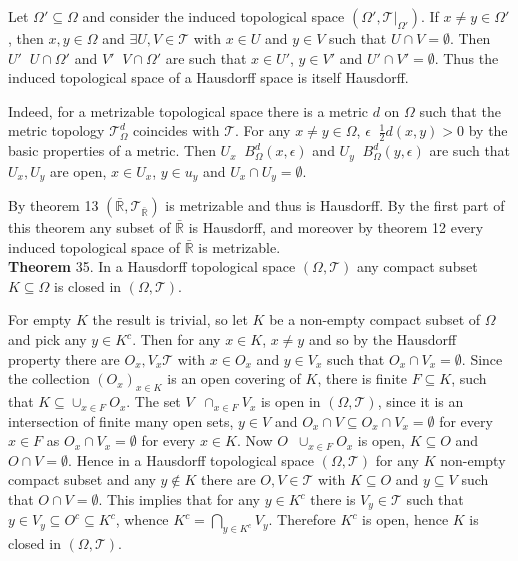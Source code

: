 \documentclass[a4paper]{article}
\newcommand{\brac}[1]{\left ( #1 \right )}
\newcommand{\induc}[1]{\left . #1 \right \vert}
\newcommand{\Rbar}{{\bar{\mathbb{R}}}}
\newcommand{\Tcal}{\mathcal{T}}
\newcommand{\defn}{\mathop{\overset{\Delta}{=}}\nolimits}
\begin{document}
Let $\Omega'\subseteq \Omega$ and consider the induced topological space $\brac{\Omega', \induc{\Tcal}_{\Omega'}}$. If $x\neq y\in \Omega'$, then $x, y\in\Omega$ and $\exists U, V\in \Tcal$ with $x\in U$ and $y\in V$ such that $U\cap V = \emptyset$. Then $U'\defn U\cap \Omega'$ and $V'\defn V\cap \Omega'$ are such that $x\in U'$, $y\in V'$ and $U'\cap V' = \emptyset$. Thus the induced topological space of a Hausdorff space is itself Hausdorff.

Indeed, for a metrizable topological space there is a metric $d$ on $\Omega$ such that the metric topology $\Tcal_\Omega^d$ coincides with $\Tcal$. For any $x\neq y\in \Omega$, $\epsilon\defn \frac{1}{2} d\brac{x,y} > 0$ by the basic properties of a metric. Then $U_x\defn B_\Omega^d\brac{x, \epsilon}$ and $U_y\defn B_\Omega^d\brac{y, \epsilon}$ are such that $U_x, U_y$ are open, $x\in U_x$, $y\in u_y$ and $U_x\cap U_y = \emptyset$.

By theorem 13 $\brac{\Rbar, \Tcal_\Rbar}$ is metrizable and thus is Hausdorff. By the first part of this theorem any subset of $\Rbar$ is Hausdorff, and moreover by theorem 12 every induced topological space of $\Rbar$ is metrizable.\\

\label{thm:hausdorf_compact_closed} \noindent \textbf{Theorem} 35.
In a Hausdorff topological space $\brac{\Omega, \Tcal}$ any compact subset $K\subseteq \Omega$ is closed in $\brac{\Omega, \Tcal}$.

For empty $K$ the result is trivial, so let $K$ be a non-empty compact subset of $\Omega$ and pick any $y\in K^c$. Then for any $x\in K$, $x\neq y$ and so by the Hausdorff property there are $O_x, V_x\Tcal$ with $x\in O_x$ and $y\in V_x$ such that $O_x\cap V_x = \emptyset$. Since the collection $\brac{O_x}_{x\in K}$ is an open covering of $K$, there is finite $F\subseteq K$, such that $K\subseteq \cup_{x\in F} O_x$. The set $V\defn \cap_{x\in F} V_x$ is open in $\brac{\Omega, \Tcal}$, since it is an intersection of finite many open sets, $y\in V$ and $O_x\cap V \subseteq O_x\cap V_x = \emptyset$ for every $x\in F$ as $O_x\cap V_x = \emptyset$ for every $x\in K$. Now $O\defn \cup_{x\in F} O_x$ is open, $K\subseteq O$ and $O\cap V = \emptyset$. Hence in a Hausdorff topological space $\brac{\Omega, \Tcal}$ for any $K$ non-empty compact subset and any $y\notin K$ there are $O,V\in \Tcal$ with $K\subseteq O$ and $y\subseteq V$ such that $O\cap V = \emptyset$. This implies that for any $y\in K^c$ there is $V_y\in \Tcal$ such that $y\in V_y\subseteq O^c\subseteq K^c$, whence $K^c = \bigcap_{y\in K^c} V_y$. Therefore $K^c$ is open, hence $K$ is closed in $\brac{\Omega, \Tcal}$.\\
\end{document}
